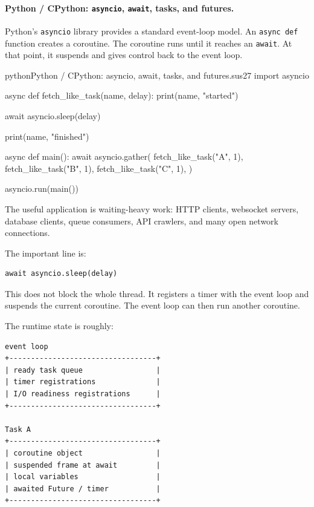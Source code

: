 \paragraph{Python / CPython: \texttt{asyncio}, \texttt{await}, tasks, and futures.}

Python's \texttt{asyncio} library provides a standard event-loop model. An \texttt{async def} function creates a coroutine. The coroutine runs until it reaches an \texttt{await}. At that point, it suspends and gives control back to the event loop.

\begin{codebox}[]{python}{Python / CPython: asyncio, await, tasks, and futures.}{sus27}
import asyncio


async def fetch_like_task(name, delay):
    print(name, "started")

    await asyncio.sleep(delay)

    print(name, "finished")


async def main():
    await asyncio.gather(
        fetch_like_task("A", 1),
        fetch_like_task("B", 1),
        fetch_like_task("C", 1),
    )


asyncio.run(main())
\end{codebox}


The useful application is waiting-heavy work: HTTP clients, websocket servers, database clients, queue consumers, API crawlers, and many open network connections.

The important line is:

\begin{verbatim}
await asyncio.sleep(delay)
\end{verbatim}

This does not block the whole thread. It registers a timer with the event loop and suspends the current coroutine. The event loop can then run another coroutine.

The runtime state is roughly:

\begin{verbatim}
event loop
+----------------------------------+
| ready task queue                 |
| timer registrations              |
| I/O readiness registrations      |
+----------------------------------+

Task A
+----------------------------------+
| coroutine object                 |
| suspended frame at await         |
| local variables                  |
| awaited Future / timer           |
+----------------------------------+
\end{verbatim}

